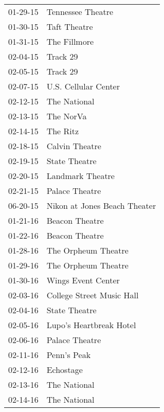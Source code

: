 \begin{supertabular}{p{0.25\columnwidth}p{0.75\columnwidth}}
 01-29-15 &                     Tennessee Theatre \\
 01-30-15 &                          Taft Theatre \\
 01-31-15 &                          The Fillmore \\
 02-04-15 &                              Track 29 \\
 02-05-15 &                              Track 29 \\
 02-07-15 &                  U.S. Cellular Center \\
 02-12-15 &                          The National \\
 02-13-15 &                             The NorVa \\
 02-14-15 &                              The Ritz \\
 02-18-15 &                        Calvin Theatre \\
 02-19-15 &                         State Theatre \\
 02-20-15 &                      Landmark Theatre \\
 02-21-15 &                        Palace Theatre \\
 06-20-15 &          Nikon at Jones Beach Theater \\
 01-21-16 &                        Beacon Theatre \\
 01-22-16 &                        Beacon Theatre \\
 01-28-16 &                   The Orpheum Theatre \\
 01-29-16 &                   The Orpheum Theatre \\
 01-30-16 &                    Wings Event Center \\
 02-03-16 &             College Street Music Hall \\
 02-04-16 &                         State Theatre \\
 02-05-16 &               Lupo's Heartbreak Hotel \\
 02-06-16 &                        Palace Theatre \\
 02-11-16 &                           Penn's Peak \\
 02-12-16 &                             Echostage \\
 02-13-16 &                          The National \\
 02-14-16 &                          The National \\

\end{supertabular}
